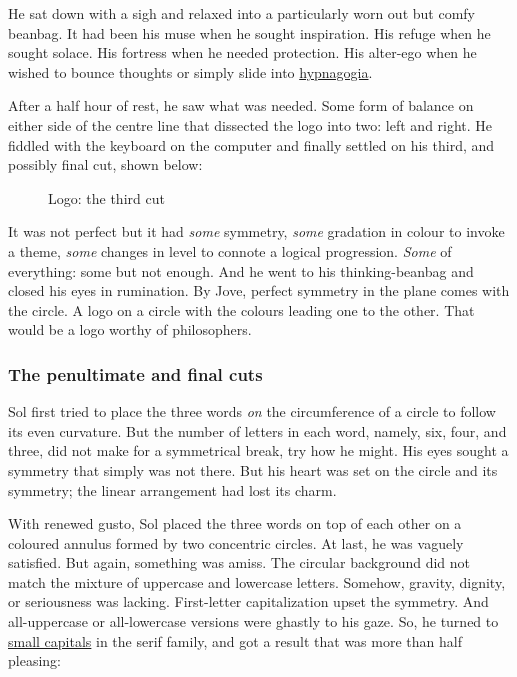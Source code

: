 \documentclass[
  a4paper,
]{article}
\begin{document}
He sat down with a sigh and relaxed into a particularly worn out but
comfy beanbag. It had been his muse when he sought inspiration. His
refuge when he sought solace. His fortress when he needed protection.
His alter-ego when he wished to bounce thoughts or simply slide into
\href{https://en.wikipedia.org/wiki/Hypnagogia}{hypnagogia}.

After a half hour of rest, he saw what was needed. Some form of balance
on either side of the centre line that dissected the logo into two: left
and right. He fiddled with the keyboard on the computer and finally
settled on his third, and possibly final cut, shown below:

\begin{figure}
\centering

\caption{Logo: the third cut}
\end{figure}

It was not perfect but it had \emph{some} symmetry, \emph{some}
gradation in colour to invoke a theme, \emph{some} changes in level to
connote a logical progression. \emph{Some} of everything: some but not
enough. And he went to his thinking-beanbag and closed his eyes in
rumination. By Jove, perfect symmetry in the plane comes with the
circle. A logo on a circle with the colours leading one to the other.
That would be a logo worthy of philosophers.

\hypertarget{the-penultimate-and-final-cuts}{%
\subsubsection{The penultimate and final
cuts}\label{the-penultimate-and-final-cuts}}

Sol first tried to place the three words \emph{on} the circumference of
a circle to follow its even curvature. But the number of letters in each
word, namely, six, four, and three, did not make for a symmetrical
break, try how he might. His eyes sought a symmetry that simply was not
there. But his heart was set on the circle and its symmetry; the linear
arrangement had lost its charm.

With renewed gusto, Sol placed the three words on top of each other on a
coloured annulus formed by two concentric circles. At last, he was
vaguely satisfied. But again, something was amiss. The circular
background did not match the mixture of uppercase and lowercase letters.
Somehow, gravity, dignity, or seriousness was lacking. First-letter
capitalization upset the symmetry. And all-uppercase or all-lowercase
versions were ghastly to his gaze. So, he turned to
\href{https://en.wikipedia.org/wiki/Small_caps}{small capitals} in the
serif family, and got a result that was more than half pleasing:
\end{document}
